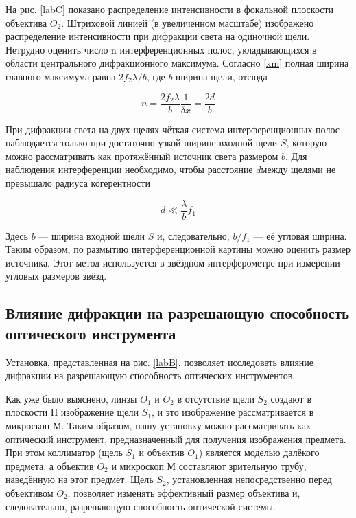 \documentclass[a4paper,12pt]{article}
\begin{document}
На рис. \ref{labC} показано распределение интенсивности в фокальной плоскости объектива $ O_2 $. Штриховой линией (в увеличенном масштабе)
изображено распределение интенсивности при дифракции света на одиночной щели. Нетрудно оценить число n интерференционных полос,
укладывающихся в области центрального дифракционного максимума.
Согласно \eqref{xm} полная ширина главного максимума равна $ 2 f_2 \lambda /b $, где $ b $ ширина щели, отсюда

\begin{equation}\label{n}
n = \dfrac{2f_2 \lambda}{b} \dfrac{1}{\delta x} = \dfrac{2d}{b}
\end{equation}

При дифракции света на двух щелях чёткая система интерференционных полос наблюдается только при достаточно узкой ширине входной щели $ S $, которую можно рассматривать как протяжённый источник света размером $ b $. Для наблюдения интерференции необходимо, чтобы расстояние $ d $между щелями не превышало радиуса когерентности

\begin{equation}\label{}
d \ll \dfrac{\lambda}{b} f_1
\end{equation}

Здесь $ b $ --- ширина входной щели $ S $ и, следовательно, $  b/f_1 $ --- её угловая ширина. Таким образом, по размытию интерференционной картины можно оценить размер источника. Этот метод используется в звёздном интерферометре при измерении угловых размеров звёзд.

\subsection{Влияние дифракции на разрешающую способность оптического инструмента}

Установка, представленная на рис. \ref{labB}, позволяет исследовать влияние дифракции на разрешающую способность оптических инструментов.

Как уже было выяснено, линзы $O_1$ и $ O_2$ в отсутствие щели $S_2$ создают в плоскости П изображение щели $S_1$, и это изображение рассматривается в микроскоп М. Таким образом, нашу установку можно рассматривать как оптический инструмент, предназначенный для получения изображения предмета. При этом коллиматор (щель $S_1$ и объектив $O_1$) является моделью далёкого предмета, а объектив $O_2$ и микроскоп М составляют зрительную трубу, наведённую на этот предмет.
Щель $S_2$, установленная непосредственно перед объективом $O_2$, позволяет изменять эффективный размер объектива и, следовательно, разрешающую способность оптической системы.
\end{document}

